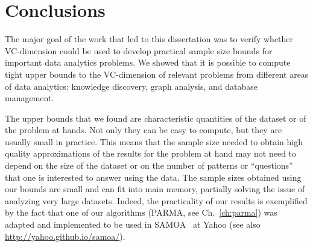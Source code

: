 \chapter{Conclusions}\label{ch:conclusions}

The major goal of the work that led to this dissertation was to verify whether
VC-dimension could be used to develop practical sample size bounds for important
data analytics problems. We showed that it is possible to compute tight upper
bounds to the VC-dimension of relevant problems from different areas of data
analytics: knowledge discovery, graph analysis, and database management. 

The upper bounds that we found are characteristic quantities of the dataset or of the
problem at hands. Not only they can be easy to compute, but they are usually
small in practice. This means that the sample size needed to obtain high quality
approximations of the results for the problem at hand may not need to depend on
the size of the dataset or on the number of patterns or ``questions'' that one
is interested to answer using the data. The sample sizes obtained using our
bounds are small and can fit into main memory, partially solving the issue of
analyzing very large datasets. Indeed, the practicality of our results is
exemplified by the fact that one of our algorithms (PARMA, see
Ch.~\ref{ch:parma}) was adapted and implemented to be used in
SAMOA~\citep{DFMorales13} at Yahoo (see also \url{http://yahoo.github.io/samoa/}).

